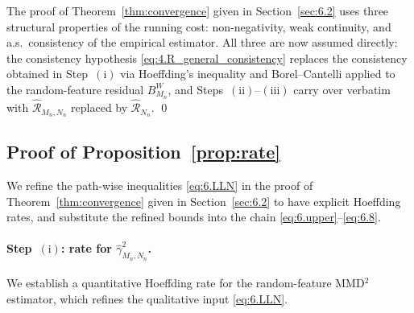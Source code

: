 \documentclass[11pt,leqno]{article}
\theoremstyle{plain}
\theoremstyle{remark}
\theoremstyle{definition}
\numberwithin{equation}{section}
\numberwithin{figure}{section}
\numberwithin{table}{section}
\numberwithin{algorithm}{section}
\begin{document}
The proof of Theorem~\ref{thm:convergence} given in Section~\ref{sec:6.2} uses three structural properties of the running cost:
non-negativity, weak continuity, and a.s.\ consistency of the empirical estimator.
All three are now assumed directly:
the consistency hypothesis \eqref{eq:4.R_general_consistency} replaces the consistency
obtained in Step~$(\mathrm{i})$ via Hoeffding's inequality and Borel--Cantelli applied to the random-feature residual $B^W_{M_n}$,
and Steps~$(\mathrm{ii})$--$(\mathrm{iii})$ carry over verbatim with $\hat{\mathcal{R}}_{M_n,N_n}$ replaced by $\hat{\mathcal{R}}_{N_n}$.
\qed


\subsection{Proof of Proposition~\ref{prop:rate}}\label{sec:6.3rate}

We refine the path-wise inequalities \eqref{eq:6.LLN}
in the proof of Theorem~\ref{thm:convergence} given in Section~\ref{sec:6.2} to have explicit Hoeffding rates,
and substitute the refined bounds into the chain \eqref{eq:6.upper}--\eqref{eq:6.8}.

\paragraph{Step~$(\mathrm{i})$: rate for $\hat{\gamma}_{M_n,N_n}^2$.}
We establish a quantitative Hoeffding rate for the random-feature MMD${}^2$ estimator,
which refines the qualitative input \eqref{eq:6.LLN}.
\end{document}
